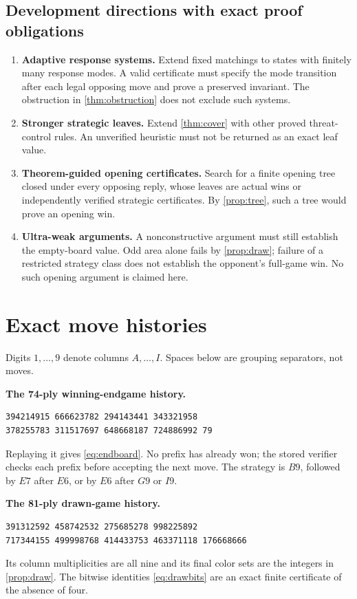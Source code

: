 \documentclass[11pt]{article}
\theoremstyle{definition}
\theoremstyle{remark}
\begin{document}
\subsection[Development directions]{Development directions with exact proof obligations}
\begin{enumerate}
\item \textbf{Adaptive response systems.} Extend fixed matchings to states
with finitely many response modes. A valid certificate must specify the mode
transition after each legal opposing move and prove a preserved invariant.
The obstruction in \cref{thm:obstruction} does not exclude such systems.
\item \textbf{Stronger strategic leaves.} Extend
\cref{thm:cover} with other proved threat-control rules. An unverified
heuristic must not be returned as an exact leaf value.
\item \textbf{Theorem-guided opening certificates.} Search for a finite
opening tree closed under every opposing reply, whose leaves are actual
wins or independently verified strategic certificates. By
\cref{prop:tree}, such a tree would prove an opening win.
\item \textbf{Ultra-weak arguments.} A nonconstructive argument must still
establish the empty-board value. Odd area alone fails by
\cref{prop:draw}; failure of a restricted strategy class does not establish
the opponent's full-game win. No such opening argument is claimed here.
\end{enumerate}

\appendix
\section{Exact move histories}\label{app:histories}
Digits $1,\ldots,9$ denote columns $A,\ldots,I$. Spaces below are grouping
separators, not moves.

\textbf{The 74-ply winning-endgame history.}
\begin{Verbatim}[fontsize=\small,frame=single]
394214915 666623782 294143441 343321958
378255783 311517697 648668187 724886992 79
\end{Verbatim}
Replaying it gives \eqref{eq:endboard}. No prefix has already won; the
stored verifier checks each prefix before accepting the next move.
The strategy is $B9$, followed by $E7$ after $E6$, or by $E6$ after $G9$
or $I9$.

\textbf{The 81-ply drawn-game history.}
\begin{Verbatim}[fontsize=\small,frame=single]
391312592 458742532 275685278 998225892
717344155 499998768 414433753 463371118 176668666
\end{Verbatim}
Its column multiplicities are all nine and its final color sets are the
integers in \cref{prop:draw}. The bitwise identities
\eqref{eq:drawbits} are an exact finite certificate of the absence of four.
\end{document}
